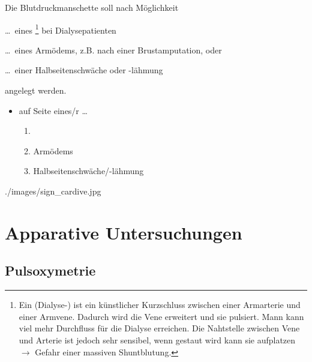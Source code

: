 {
Die Blutdruckmanschette soll nach Möglichkeit 
\begin{inparaenum}
	\item \ldots\ eines \footnote{Ein (Dialyse-) ist ein
	künstlicher Kurzschluss zwischen einer Armarterie und einer Armvene. Dadurch wird
		die Vene erweitert und sie pulsiert. Mann kann viel mehr
		Durchfluss für die Dialyse erreichen. Die Nahtstelle
		zwischen Vene und Arterie ist jedoch sehr sensibel, wenn
		gestaut wird kann sie aufplatzen $\rightarrow$ Gefahr
		einer massiven Shuntblutung.} bei Dialysepatienten
		\item \ldots\ eines Armödems, z.B. nach einer
		Brustamputation, oder
		\item \ldots\ einer Halbseitenschwäche oder -lähmung 
\end{inparaenum} 
angelegt werden.

}{
\begin{itemize}
  \item {} auf Seite eines/r \dots{}
  \begin{enumerate}
    \item {}
    \item Armödems
    \item Halbseitenschwäche/-lähmung
  \end{enumerate}
\end{itemize}

}{./images/sign_cardive.jpg}{}{}










\section{Apparative Untersuchungen}

\subsection{Pulsoxymetrie}
\label{topic:pulsoxymetrie}



